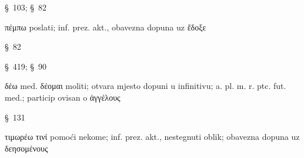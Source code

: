 \begin{description}[noitemsep]
\item[κοινῷ λόγῳ ] §~103; §~82
\item[πέμπειν ] πέμπω poslati; inf. prez. akt., obavezna dopuna uz ἔδοξε
\item[ἀγγέλους ] §~82
\item[ἐς Σπάρτην ] §~419; §~90
\item[δεησομένους ] δέω med. δέομαι moliti; otvara mjesto dopuni u infinitivu; a. pl. m. r. ptc. fut. med.; particip ovisan o ἀγγέλους
\item[Ἴωσι ] §~131
\item[τιμωρέειν] τιμωρέω τινί pomoći nekome; inf. prez. akt., nestegnuti oblik; obavezna dopuna uz δεησομένους

\end{description}

